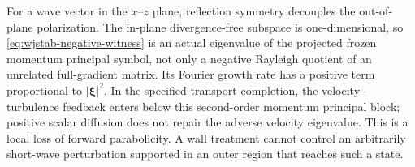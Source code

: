 \documentclass[11pt,a4paper]{article}
\numberwithin{equation}{section}
\begin{document}
For a wave vector in the $x$--$z$ plane, reflection symmetry decouples
the out-of-plane polarization. The in-plane divergence-free subspace
is one-dimensional, so \eqref{eq:wjstab-negative-witness} is an actual
eigenvalue of the projected frozen momentum principal symbol, not only
a negative Rayleigh quotient of an unrelated full-gradient matrix.
Its Fourier growth rate has a positive term proportional to
$|\boldsymbol\xi|^2$. In the specified transport completion, the
velocity--turbulence feedback enters below this second-order momentum
principal block; positive scalar diffusion does not repair the adverse
velocity eigenvalue. This is a local loss of forward parabolicity.
A wall treatment cannot control an arbitrarily short-wave perturbation
supported in an outer region that reaches such a state.

\end{document}
